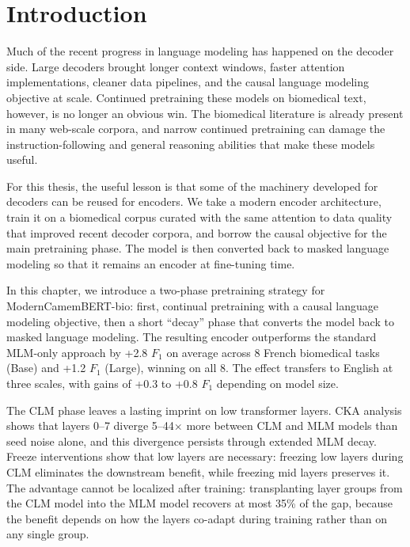 
\section{Introduction}

\begin{reviewread}
Much of the recent progress in language modeling has happened on the decoder side. Large decoders brought longer context windows, faster attention implementations, cleaner data pipelines, and the causal language modeling objective at scale. Continued pretraining these models on biomedical text, however, is no longer an obvious win. The biomedical literature is already present in many web-scale corpora, and narrow continued pretraining can damage the instruction-following and general reasoning abilities that make these models useful.
\end{reviewread}

\begin{reviewread}
For this thesis, the useful lesson is that some of the machinery developed for decoders can be reused for encoders. We take a modern encoder architecture, train it on a biomedical corpus curated with the same attention to data quality that improved recent decoder corpora, and borrow the causal objective for the main pretraining phase. The model is then converted back to masked language modeling so that it remains an encoder at fine-tuning time.
\end{reviewread}

\begin{reviewread}
In this chapter, we introduce a two-phase pretraining strategy for ModernCamemBERT-bio: first, continual pretraining with a causal language modeling objective, then a short ``decay'' phase that converts the model back to masked language modeling. The resulting encoder outperforms the standard MLM-only approach by +2.8 $F_1$ on average across 8 French biomedical tasks (Base) and +1.2 $F_1$ (Large), winning on all 8. The effect transfers to English at three scales, with gains of +0.3 to +0.8 $F_1$ depending on model size.
\end{reviewread}

\begin{reviewread}
The CLM phase leaves a lasting imprint on low transformer layers. CKA analysis shows that layers 0--7 diverge 5--44$\times$ more between CLM and MLM models than seed noise alone, and this divergence persists through extended MLM decay. Freeze interventions show that low layers are necessary: freezing low layers during CLM eliminates the downstream benefit, while freezing mid layers preserves it. The advantage cannot be localized after training: transplanting layer groups from the CLM model into the MLM model recovers at most 35\% of the gap, because the benefit depends on how the layers co-adapt during training rather than on any single group.
\end{reviewread}


